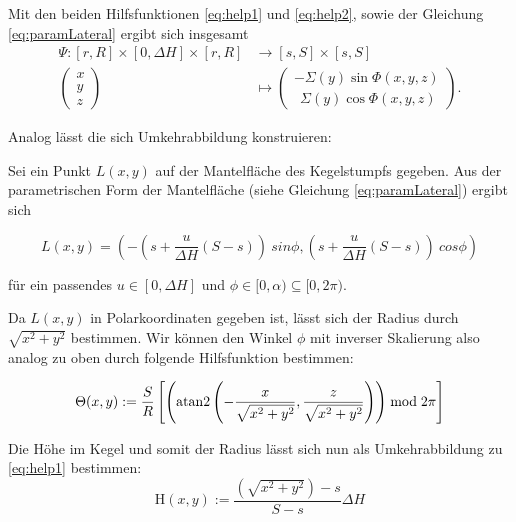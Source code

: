 Mit den beiden Hilfsfunktionen \ref{eq:help1} und \ref{eq:help2}, sowie der Gleichung \ref{eq:paramLateral} ergibt sich insgesamt
\begin{equation}\label{eq:coneToLateral}
\begin{aligned}
\Psi \colon [r,R] \times [0, \Delta H] \times [r,R] &\to [s,S] \times [s,S]\\
\begin{pmatrix}
x \\ y \\ z
\end{pmatrix}  &\mapsto
\begin{pmatrix}
-\Sigma(y)\sin \Phi(x,y,z)\\
 ~~\Sigma(y)\cos\Phi(x,y,z)
\end{pmatrix}.
\end{aligned}
\end{equation}

Analog lässt die sich Umkehrabbildung konstruieren:

Sei ein Punkt $L(x,y)$ auf der Mantelfläche des Kegelstumpfs gegeben. Aus der parametrischen Form der Mantelfläche (siehe Gleichung \ref{eq:paramLateral}) ergibt sich

\[
L(x,y) = (-(s + \frac{u}{\Delta H}(S-s)) ~sin \phi, (s + \frac{u}{\Delta H} (S-s)) ~cos \phi)
\]

für ein passendes $u\in [0, \Delta H]$ und $\phi \in [0, \alpha) \subseteq  [0, 2\pi)$.

Da $L(x,y)$ in Polarkoordinaten gegeben ist, lässt sich der Radius durch $\sqrt{x^2+y^2}$ bestimmen. Wir können den Winkel $\phi$ mit inverser Skalierung also analog zu oben durch folgende Hilfsfunktion bestimmen:

\begin{equation}\label{eq:help3}
\Theta(x,y) := \frac{S}{R} \left[\left(\text{atan2}\left(-\frac{x}{\sqrt{x^2+y^2}}, \frac{z}{\sqrt{x^2+y^2}}\right)\right) \bmod 2\pi \right]
\end{equation}

Die Höhe  im Kegel und somit der Radius lässt sich nun als Umkehrabbildung zu \ref{eq:help1} bestimmen:
\begin{equation}\label{eq:help4}
\mathrm{H}(x,y) := \frac{\left(\sqrt{x^2+y^2}\right) - s}{S - s}\Delta H
\end{equation}

